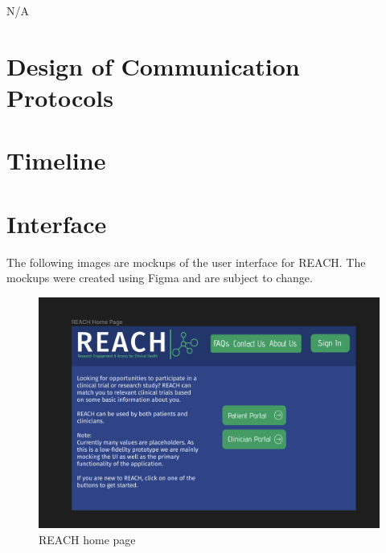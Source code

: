 \documentclass[12pt, titlepage]{article}
\begin{document}
N/A

\section{Design of Communication Protocols}

\section{Timeline}


% 

\newpage{}

\appendix

\section{Interface} 

The following images are mockups of the user interface for REACH. The mockups were created using Figma and are subject to change.

\begin{figure}[H]
  \centering
  \includegraphics[width=0.9\linewidth]{images/HomePage.png}
  \caption{REACH home page}
  \label{fig:figure1}
\end{figure}
\end{document}
